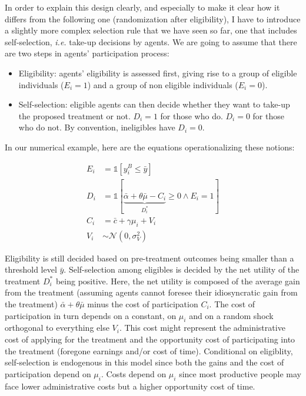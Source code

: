 \documentclass[]{book}
\providecommand{\tightlist}{%
  \setlength{\itemsep}{0pt}\setlength{\parskip}{0pt}}
\newcommand{\uns}[1]{\mathds{1}[ #1 ]}
\theoremstyle{definition}
\theoremstyle{definition}
\theoremstyle{definition}
\theoremstyle{remark}
\let\BeginKnitrBlock\begin \let\EndKnitrBlock\end
\begin{document}
In order to explain this design clearly, and especially to make it clear
how it differs from the following one (randomization after eligibility),
I have to introduce a slightly more complex selection rule that we have
seen so far, one that includes self-selection, \textit{i.e.} take-up
decisions by agents. We are going to assume that there are two steps in
agents' participation process:

\begin{itemize}
\tightlist
\item
  Eligibility: agents' eligibility is assessed first, giving rise to a
  group of eligible individuals (\(E_i=1\)) and a group of non eligible
  individuals (\(E_i=0\)).
\item
  Self-selection: eligible agents can then decide whether they want to
  take-up the proposed treatment or not. \(D_i=1\) for those who do.
  \(D_i=0\) for those who do not. By convention, ineligibles have
  \(D_i=0\).
\end{itemize}

\BeginKnitrBlock{example}
\protect\hypertarget{exm:unnamed-chunk-78}{}{\label{exm:unnamed-chunk-78}
}In our numerical example, here are the equations operationalizing these
notions:
\EndKnitrBlock{example}

\begin{align*}
E_i & = \uns{y_i^B\leq\bar{y}} \\
D_i & = \uns{\underbrace{\bar{\alpha}+\theta\bar{\mu}-C_i}_{D_i^*}\geq0 \land E_i=1} \\
C_i & = \bar{c} + \gamma \mu_i + V_i\\
V_i & \sim \mathcal{N}(0,\sigma^2_V)
\end{align*}

Eligibility is still decided based on pre-treatment outcomes being
smaller than a threshold level \(\bar{y}\). Self-selection among
eligibles is decided by the net utility of the treatment \(D_i^*\) being
positive. Here, the net utility is composed of the average gain from the
treatment (assuming agents cannot foresee their idiosyncratic gain from
the treatment) \(\bar{\alpha}+\theta\bar{\mu}\) minus the cost of
participation \(C_i\). The cost of participation in turn depends on a
constant, on \(\mu_i\) and on a random shock orthogonal to everything
else \(V_i\). This cost might represent the administrative cost of
applying for the treatment and the opportunity cost of participating
into the treatment (foregone earnings and/or cost of time). Conditional
on eligiblity, self-selection is endogenous in this model since both the
gains and the cost of participation depend on \(\mu_i\). Costs depend on
\(\mu_i\) since most productive people may face lower administrative
costs but a higher opportunity cost of time.
\end{document}

